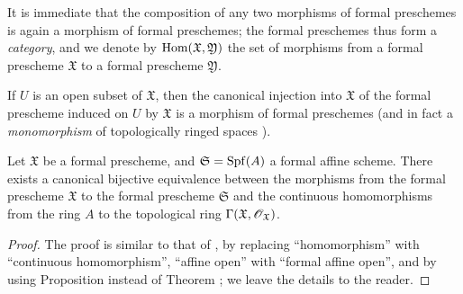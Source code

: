 It is immediate that the composition of any two morphisms of formal preschemes is again a morphism of formal preschemes; the formal preschemes thus form a \emph{category}, and we denote by $\operatorname{Hom}(\mathfrak{X},\mathfrak{Y})$ the set of morphisms from a formal prescheme $\mathfrak{X}$ to a formal prescheme $\mathfrak{Y}$.

If $U$ is an open subset of $\mathfrak{X}$, then the canonical injection into $\mathfrak{X}$ of the formal prescheme induced on $U$ by $\mathfrak{X}$ is a morphism of formal preschemes (and in fact a \emph{monomorphism} of topologically ringed spaces ).

\begin{proposition}[10.4.6]
\label{1.10.4.6}
Let $\mathfrak{X}$ be a formal prescheme, and $\mathfrak{S}=\operatorname{Spf}(A)$ a formal affine scheme.
There exists a canonical bijective equivalence between the morphisms from the formal prescheme $\mathfrak{X}$ to the formal prescheme $\mathfrak{S}$ and the continuous homomorphisms from the ring $A$ to the topological ring $\Gamma(\mathfrak{X},\mathscr{O}_\mathfrak{X})$.
\end{proposition}

\begin{proof}
\label{proof-1.10.4.6}
The proof is similar to that of , by replacing ``homomorphism'' with ``continuous homomorphism'', ``affine open'' with ``formal affine open'', and by using Proposition  instead of Theorem ; we leave the details to the reader.
\end{proof}

